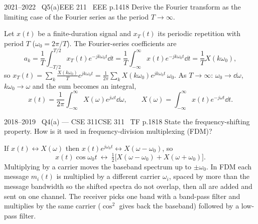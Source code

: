 \begin{qcard}{2021--2022 \textbullet\ Q5(a)}{EEE 211 \textbullet\ EEE p.14}{18}
Derive the Fourier transform as the limiting case of the Fourier series as the period $T\to\infty$.
\end{qcard}
\begin{solution}
Let $x(t)$ be a finite-duration signal and $x_T(t)$ its periodic repetition with period $T$ ($\omega_0=2\pi/T$). The Fourier-series coefficients are
\[a_k=\frac1T\int_{-T/2}^{T/2}x_T(t)e^{-jk\omega_0t}\dd t=\frac1T\int_{-\infty}^{\infty}x(t)e^{-jk\omega_0t}\dd t=\frac1TX(k\omega_0),\]
so $x_T(t)=\displaystyle\sum_k\frac{X(k\omega_0)}{T}e^{jk\omega_0t}=\frac1{2\pi}\sum_kX(k\omega_0)e^{jk\omega_0t}\,\omega_0$.
As $T\to\infty$: $\omega_0\to\dd\omega$, $k\omega_0\to\omega$ and the sum becomes an integral,
\[x(t)=\frac1{2\pi}\int_{-\infty}^\infty X(\omega)e^{j\omega t}\dd\omega,\qquad X(\omega)=\int_{-\infty}^\infty x(t)e^{-j\omega t}\dd t.\]
\end{solution}

\begin{qcard}{2018--2019 \textbullet\ Q4(a) --- CSE 311}{CSE 311 \textbullet\ TF p.18}{18}
State the frequency-shifting property. How is it used in frequency-division multiplexing (FDM)?
\end{qcard}
\begin{solution}
If $x(t)\leftrightarrow X(\omega)$ then $x(t)e^{j\omega_0t}\leftrightarrow X(\omega-\omega_0)$, so
\[x(t)\cos\omega_0t\ \leftrightarrow\ \tfrac12\big[X(\omega-\omega_0)+X(\omega+\omega_0)\big].\]
Multiplying by a carrier moves the baseband spectrum up to $\pm\omega_0$. In FDM each message $m_i(t)$ is multiplied by a different carrier $\omega_i$, spaced by more than the message bandwidth so the shifted spectra do not overlap, then all are added and sent on one channel. The receiver picks one band with a band-pass filter and multiplies by the same carrier ($\cos^2$ gives back the baseband) followed by a low-pass filter.
\end{solution}
